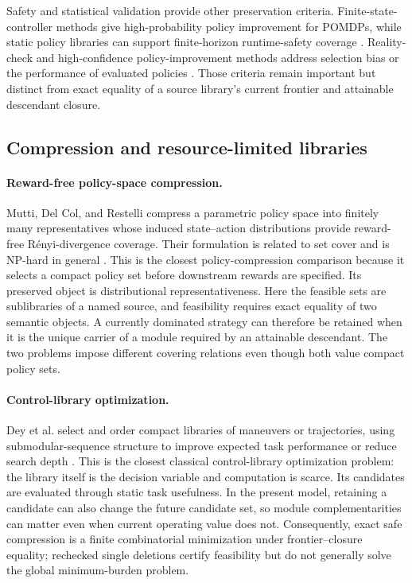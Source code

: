 Safety and statistical validation provide other preservation criteria.
Finite-state-controller methods give high-probability policy improvement for
POMDPs, while static policy libraries can support finite-horizon runtime-safety
coverage \cite{SimaoSuilenJansen2023,KimEtAl2026PLCBF}.  Reality-check and
high-confidence policy-improvement methods address selection bias or the
performance of evaluated policies
\cite{White2000,ThomasTheocharousGhavamzadeh2015}.  Those criteria remain
important but distinct from exact equality of a source library's current
frontier and attainable descendant closure.

\subsection{Compression and resource-limited libraries}

\paragraph{Reward-free policy-space compression.}
Mutti, Del Col, and Restelli compress a parametric policy space into finitely
many representatives whose induced state--action distributions provide
reward-free R\'enyi-divergence coverage.  Their formulation is related to set
cover and is NP-hard in general \cite{MuttiDelColRestelli2022}.  This is the
closest policy-compression comparison because it selects a compact policy set
before downstream rewards are specified.  Its preserved object is
distributional representativeness.  Here the feasible sets are sublibraries
of a named source, and feasibility requires exact equality of two semantic
objects.  A currently dominated strategy can therefore be retained when it is
the unique carrier of a module required by an attainable descendant.  The two
problems impose different covering relations even though both value compact
policy sets.

\paragraph{Control-library optimization.}
Dey et al. select and order compact libraries of maneuvers or trajectories,
using submodular-sequence structure to improve expected task performance or
reduce search depth \cite{DeyEtAl2012}.  This is the closest classical
control-library optimization problem: the library itself is the decision
variable and computation is scarce.  Its candidates are evaluated through
static task usefulness.  In the present model, retaining a candidate can also
change the future candidate set, so module complementarities can matter even
when current operating value does not.  Consequently, exact safe compression
is a finite combinatorial minimization under frontier--closure equality;
rechecked single deletions certify feasibility but do not generally solve the
global minimum-burden problem.

